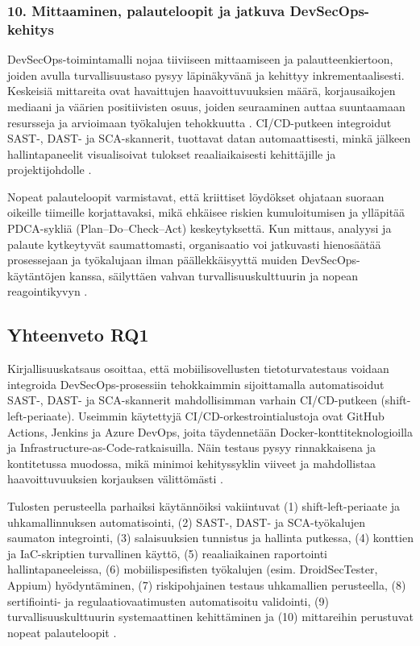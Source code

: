 \documentclass[bscthesis,finnish,oneside,biblatex]{uefcsthesis}
\begin{document}
\subsubsection{10. Mittaaminen, palauteloopit ja jatkuva DevSecOps-kehitys}

DevSecOps-toimintamalli nojaa tiiviiseen mittaamiseen ja palautteenkiertoon, joiden avulla turvallisuustaso pysyy läpinäkyvänä ja kehittyy inkrementaalisesti. Keskeisiä mittareita ovat havaittujen haavoittuvuuksien määrä, korjausaikojen mediaani ja väärien positiivisten osuus, joiden seuraaminen auttaa suuntaamaan resursseja ja arvioimaan työkalujen tehokkuutta \cite{chung2024_devsecops}. CI/CD-putkeen integroidut SAST-, DAST- ja SCA-skannerit, tuottavat datan automaattisesti, minkä jälkeen hallintapaneelit visualisoivat tulokset reaaliaikaisesti kehittäjille ja projektijohdolle \cite{marandi2023_ias,feio2024_empirical}.

Nopeat palauteloopit varmistavat, että kriittiset löydökset ohjataan suoraan oikeille tiimeille korjattavaksi, mikä ehkäisee riskien kumuloitumisen ja ylläpitää PDCA-sykliä (Plan–Do–Check–Act) keskeytyksettä. Kun mittaus, analyysi ja palaute kytkeytyvät saumattomasti, organisaatio voi jatkuvasti hienosäätää prosessejaan ja työkalujaan ilman päällekkäisyyttä muiden DevSecOps-käytäntöjen kanssa, säilyttäen vahvan turvallisuuskulttuurin ja nopean reagointikyvyn \cite{feio2024_empirical}.

\subsection*{Yhteenveto RQ1}

Kirjallisuuskatsaus osoittaa, että mobiilisovellusten tietoturvatestaus voidaan integroida DevSecOps-prosessiin tehokkaimmin sijoittamalla automatisoidut SAST-, DAST- ja SCA-skannerit mahdollisimman varhain CI/CD-putkeen (shift-left-periaate). Useimmin käytettyjä CI/CD-orkestrointialustoja ovat GitHub Actions, Jenkins ja Azure DevOps, joita täydennetään Docker-konttiteknologioilla ja Infrastructure-as-Code-ratkaisuilla. Näin testaus pysyy rinnakkaisena ja kontitetussa muodossa, mikä minimoi kehityssyklin viiveet ja mahdollistaa haavoittuvuuksien korjauksen välittömästi \cite{marandi2023_ias,feio2024_empirical,kushwaha2024_cct}.

Tulosten perusteella parhaiksi käytännöiksi vakiintuvat (1) shift-left-periaate ja uhkamallinnuksen automatisointi, (2) SAST-, DAST- ja SCA-työkalujen saumaton integrointi, (3) salaisuuksien tunnistus ja hallinta putkessa, (4) konttien ja IaC-skriptien turvallinen käyttö, (5) reaaliaikainen raportointi hallintapaneeleissa, (6) mobiilispesifisten työkalujen (esim. DroidSecTester, Appium) hyödyntäminen, (7) riskipohjainen testaus uhkamallien perusteella, (8) sertifiointi- ja regulaatiovaatimusten automatisoitu validointi, (9) turvallisuuskulttuurin systemaattinen kehittäminen ja (10) mittareihin perustuvat nopeat palauteloopit \cite{nikolov2024_fit,baheux2023_droidsectester,dupont2021_incremental,feio2024_empirical,kushwaha2024_cct,marandi2023_ias,aljohani2023_automating,ozdenizci2024mobilizing,byman2024continuous,chung2024_devsecops}.
\end{document}

